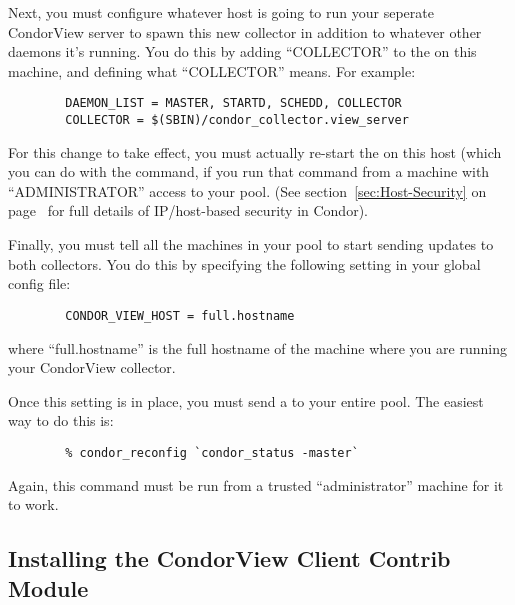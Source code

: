 Next, you must configure whatever host is going to run your seperate
CondorView server to spawn this new collector in addition to whatever
other daemons it's running.
You do this by adding ``COLLECTOR'' to the  on
this machine, and defining what ``COLLECTOR'' means.
For example:
\begin{verbatim}
        DAEMON_LIST = MASTER, STARTD, SCHEDD, COLLECTOR
        COLLECTOR = $(SBIN)/condor_collector.view_server
\end{verbatim}
For this change to take effect, you must actually re-start the
 on this host (which you can do with the
 command, if you run that command from a machine with 
``ADMINISTRATOR'' access to your pool.
(See section~\ref{sec:Host-Security} on
page~\pageref{sec:Host-Security} for full details of IP/host-based
security in Condor).

Finally, you must tell all the machines in your pool to start sending
updates to both collectors.
You do this by specifying the following setting in your global config
file:
\begin{verbatim}
        CONDOR_VIEW_HOST = full.hostname
\end{verbatim}
where ``full.hostname'' is the full hostname of the machine where you
are running your CondorView collector.

Once this setting is in place, you must send a  to
your entire pool.  The easiest way to do this is:
\begin{verbatim}
        % condor_reconfig `condor_status -master`
\end{verbatim}
Again, this command must be run from a trusted ``administrator''
machine for it to work.  

\subsection{\label{sec:CondorView-Client-Install}
Installing the CondorView Client Contrib Module} 

\Todo